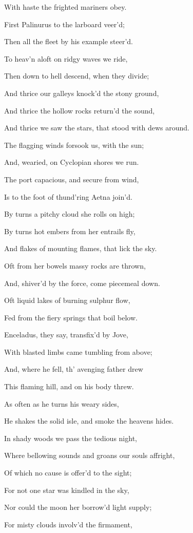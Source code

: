 With haste the frighted mariners obey.

First Palinurus to the larboard veer’d;

Then all the fleet by his example steer’d.

To heav’n aloft on ridgy waves we ride,

Then down to hell descend, when they divide;

And thrice our galleys knock’d the stony ground,

And thrice the hollow rocks return’d the sound,

And thrice we saw the stars, that stood with dews around.

The flagging winds forsook us, with the sun;

And, wearied, on Cyclopian shores we run.

The port capacious, and secure from wind,

Is to the foot of thund’ring Aetna join’d.

By turns a pitchy cloud she rolls on high;

By turns hot embers from her entrails fly,

And flakes of mounting flames, that lick the sky.

Oft from her bowels massy rocks are thrown,

And, shiver’d by the force, come piecemeal down.

Oft liquid lakes of burning sulphur flow,

Fed from the fiery springs that boil below.

Enceladus, they say, transfix’d by Jove,

With blasted limbs came tumbling from above;

And, where he fell, th’ avenging father drew

This flaming hill, and on his body threw.

As often as he turns his weary sides,

He shakes the solid isle, and smoke the heavens hides.

In shady woods we pass the tedious night,

Where bellowing sounds and groans our souls affright,

Of which no cause is offer’d to the sight;

For not one star was kindled in the sky,

Nor could the moon her borrow’d light supply;

For misty clouds involv’d the firmament,

